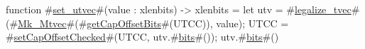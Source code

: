 function #\hyperref[sailRISCVzsetzyutvec]{set\_utvec}#(value : xlenbits) -> xlenbits = {
  let utv = #\hyperref[sailRISCVzlegalizzezytvec]{legalize\_tvec}#(#\hyperref[sailRISCVzMkzyMtvec]{Mk\_Mtvec}#(#\hyperref[sailRISCVzgetCapOffsetBits]{getCapOffsetBits}#(UTCC)), value);
  UTCC = #\hyperref[sailRISCVzsetCapOffsetChecked]{setCapOffsetChecked}#(UTCC, utv.#\hyperref[sailRISCVzbits]{bits}#());
  utv.#\hyperref[sailRISCVzbits]{bits}#()
}
